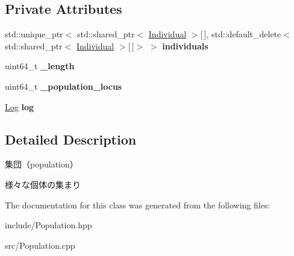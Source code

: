 \subsection*{Private Attributes}
\begin{DoxyCompactItemize}
\item 
\mbox{\label{class_g_a_1_1_population_aab745d770cf42b7c2f0817e3b028689d}} 
std\+::unique\+\_\+ptr$<$ std\+::shared\+\_\+ptr$<$ \mbox{\hyperlink{class_g_a_1_1_individual}{Individual}} $>$\mbox{[}$\,$\mbox{]}, std\+::default\+\_\+delete$<$ std\+::shared\+\_\+ptr$<$ \mbox{\hyperlink{class_g_a_1_1_individual}{Individual}} $>$\mbox{[}$\,$\mbox{]}$>$ $>$ {\bfseries individuals}
\item 
\mbox{\label{class_g_a_1_1_population_a10e07cdeda4b84792cd7761f35079770}} 
uint64\+\_\+t {\bfseries \+\_\+length}
\item 
\mbox{\label{class_g_a_1_1_population_aeb1fd098be08f34a663fb8b3f10b3937}} 
uint64\+\_\+t {\bfseries \+\_\+population\+\_\+locus}
\item 
\mbox{\label{class_g_a_1_1_population_a98499a0a682339d3d62d79fae9f23396}} 
\mbox{\hyperlink{class_g_a_1_1_log}{Log}} {\bfseries log}
\end{DoxyCompactItemize}


\subsection{Detailed Description}
集団（population） 

様々な個体の集まり 

The documentation for this class was generated from the following files\+:\begin{DoxyCompactItemize}
\item 
include/Population.\+hpp\item 
src/Population.\+cpp\end{DoxyCompactItemize}
